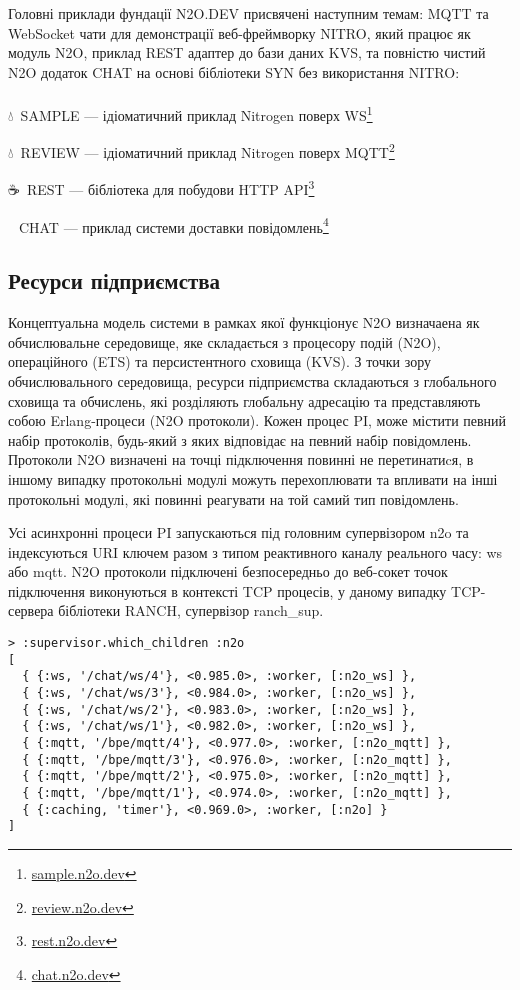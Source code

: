 Головні приклади фундації N2O.DEV присвячені наступним темам: MQTT та WebSocket
чати для демонстрації веб-фреймворку NITRO, який працює як модуль N2O, приклад
REST адаптер до бази даних KVS, та повністю чистий N2O додаток CHAT на основі
бібліотеки SYN без використання NITRO:\\
\\ \indent
\setmainfont{Segoe UI Emoji}💧\setmainfont{Geometria}\ SAMPLE --- ідіоматичний приклад Nitrogen поверх WS\footnote{\url{sample.n2o.dev}}

\setmainfont{Segoe UI Emoji}💧\setmainfont{Geometria}\ REVIEW --- ідіоматичний приклад Nitrogen поверх MQTT\footnote{\url{review.n2o.dev}}

\setmainfont{Segoe UI Emoji}☕\setmainfont{Geometria}\ REST --- бібліотека для побудови HTTP API\footnote{\url{rest.n2o.dev}}

\setmainfont{Segoe UI Emoji}💬\setmainfont{Geometria}\ CHAT --- приклад системи доставки повідомлень\footnote{\url{chat.n2o.dev}}

\newpage
\subsection{Ресурси підприємства}

Концептуальна модель системи в рамках якої функціонує N2O визначаена як обчислювальне середовище,
яке складається з процесору подій (N2O), операційного (ETS) та персистентного сховища (KVS).
З точки зору обчислювального середовища, ресурси підприємства складаються з глобального
 сховища та обчислень, які розділяють глобальну адресацію та представляють собою
Erlang-процеси (N2O протоколи). Кожен процес PI, може містити певний набір протоколів,
будь-який з яких відповідає на певний набір повідомлень. Протоколи N2O визначені на
точці підключення повинні не перетинатиcя, в іншому випадку протокольні модулі можуть
перехоплювати та впливати на інші протокольні модулі, які повинні реагувати на той
самий тип повідомлень.

Усі асинхронні процеси PI запускаються під головним супервізором n2o та індексуються
URI ключем разом з типом реактивного каналу реального часу: ws або mqtt. N2O протоколи
підключені безпосередньо до веб-сокет точок підключення виконуються в контексті TCP
процесів, у даному випадку TCP-сервера бібліотеки RANCH, супервізор ranch_sup.

\begin{lstlisting}
> :supervisor.which_children :n2o
[
  { {:ws, '/chat/ws/4'}, <0.985.0>, :worker, [:n2o_ws] },
  { {:ws, '/chat/ws/3'}, <0.984.0>, :worker, [:n2o_ws] },
  { {:ws, '/chat/ws/2'}, <0.983.0>, :worker, [:n2o_ws] },
  { {:ws, '/chat/ws/1'}, <0.982.0>, :worker, [:n2o_ws] },
  { {:mqtt, '/bpe/mqtt/4'}, <0.977.0>, :worker, [:n2o_mqtt] },
  { {:mqtt, '/bpe/mqtt/3'}, <0.976.0>, :worker, [:n2o_mqtt] },
  { {:mqtt, '/bpe/mqtt/2'}, <0.975.0>, :worker, [:n2o_mqtt] },
  { {:mqtt, '/bpe/mqtt/1'}, <0.974.0>, :worker, [:n2o_mqtt] },
  { {:caching, 'timer'}, <0.969.0>, :worker, [:n2o] }
]
\end{lstlisting}

